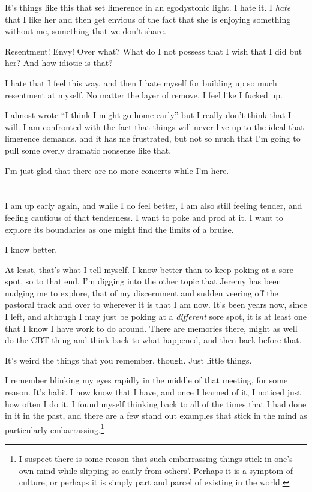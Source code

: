 It's things like this that set limerence in an egodystonic light. I hate it. I \emph{hate} that I like her and then get envious of the fact that she is enjoying something without me, something that we don't share.

Resentment! Envy! Over what? What do I not possess that I wish that I did but her? And how idiotic is that?

I hate that I feel this way, and then I hate myself for building up so much resentment at myself. No matter the layer of remove, I feel like I fucked up.

I almost wrote ``I think I might go home early'' but I really don't think that I will. I am confronted with the fact that things will never live up to the ideal that limerence demands, and it has me frustrated, but not so much that I'm going to pull some overly dramatic nonsense like that.

I'm just glad that there are no more concerts while I'm here.

\section{}

I am up early again, and while I do feel better, I am also still feeling tender, and feeling cautious of that tenderness. I want to poke and prod at it. I want to explore its boundaries as one might find the limits of a bruise.

I know better.

At least, that's what I tell myself. I know better than to keep poking at a sore spot, so to that end, I'm digging into the other topic that Jeremy has been nudging me to explore, that of my discernment and sudden veering off the pastoral track and over to wherever it is that I am now. It's been years now, since I left, and although I may just be poking at a \emph{different} sore spot, it is at least one that I know I have work to do around. There are memories there, might as well do the CBT thing and think back to what happened, and then back before that.

It's weird the things that you remember, though. Just little things.

I remember blinking my eyes rapidly in the middle of that meeting, for some reason. It's habit I now know that I have, and once I learned of it, I noticed just how often I do it. I found myself thinking back to all of the times that I had done in it in the past, and there are a few stand out examples that stick in the mind as particularly embarrassing.\footnote{I suspect there is some reason that such embarrassing things stick in one's own mind while slipping so easily from others'. Perhaps it is a symptom of culture, or perhaps it is simply part and parcel of existing in the world.}

